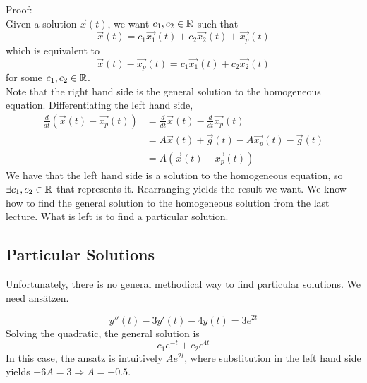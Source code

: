 \documentclass[12pt]{article}
\begin{document}
Proof: \\
Given a solution $\vec{x}(t)$, we want $c_1,c_2\in\mathbb{R}$ such that
$$\vec{x}(t) = c_1\vec{x_1}(t) + c_2\vec{x_2}(t) + \vec{x_p}(t)$$
which is equivalent to
$$\vec{x}(t) - \vec{x_p}(t) = c_1\vec{x_1}(t) + c_2\vec{x_2}(t)$$
for some $c_1,c_2\in\mathbb{R}$. \\
Note that the right hand side is the general solution to the homogeneous equation. Differentiating the left hand side,
\begin{align*}
	\frac{d}{dt}\left(\vec{x}(t)-\vec{x_p}(t)\right) &= \frac{d}{dt}\vec{x}(t) - \frac{d}{dt}\vec{x_p}(t) \\
							 &= A\vec{x}(t) + \vec{g}(t) - A\vec{x_p}(t) - \vec{g}(t) \\
							 &= A\left(\vec{x}(t)-\vec{x_p}(t)\right)
\end{align*}
We have that the left hand side is a solution to the homogeneous equation, so $\exists c_1,c_2\in\mathbb{R}$ that represents it. Rearranging yields the result we want. We know how to find the general solution to the homogeneous solution from the last lecture. What is left is to find a particular solution.

\subsection{Particular Solutions}
Unfortunately, there is no general methodical way to find particular solutions. We need ans\"atzen.

\begin{ex}
	$$y''(t) - 3y'(t) - 4y(t) = 3e^{2t}$$
	Solving the quadratic, the general solution is
	$$c_1e^{-t} + c_2e^{4t}$$
	In this case, the ansatz is intuitively $Ae^{2t}$, where substitution in the left hand side yields $-6A = 3 \Rightarrow A = -0.5$.
\end{ex}
\end{document}
